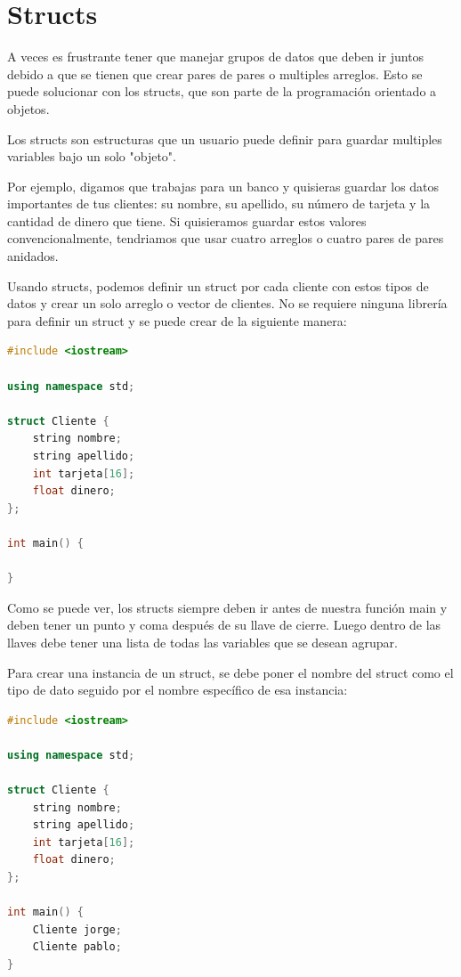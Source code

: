 \documentclass{article}
\begin{document}
\section{Structs}

A veces es frustrante tener que manejar grupos de datos que deben ir juntos debido a que se tienen que crear pares de pares o multiples arreglos. Esto se puede solucionar con los structs, que son parte de la programación orientado a objetos.

Los structs son estructuras que un usuario puede definir para guardar multiples variables bajo un solo "objeto".

Por ejemplo, digamos que trabajas para un banco y quisieras guardar los datos importantes de tus clientes: su nombre, su apellido, su número de tarjeta y la cantidad de dinero que tiene. Si quisieramos guardar estos valores convencionalmente, tendriamos que usar cuatro arreglos o cuatro pares de pares anidados.

Usando structs, podemos definir un struct por cada cliente con estos tipos de datos y crear un solo arreglo o vector de clientes. No se requiere ninguna librería para definir un struct y se puede crear de la siguiente manera:

\begin{lstlisting}[language=C++, title=Definición de un struct]
#include <iostream>

using namespace std;

struct Cliente {
	string nombre;
	string apellido;
	int tarjeta[16];
	float dinero;
};

int main() {

}
\end{lstlisting}

Como se puede ver, los structs siempre deben ir antes de nuestra función main y deben tener un punto y coma después de su llave de cierre. Luego dentro de las llaves debe tener una lista de todas las variables que se desean agrupar.

Para crear una instancia de un struct, se debe poner el nombre del struct como el tipo de dato seguido por el nombre específico de esa instancia:

\begin{lstlisting}[language=C++, title=Instanciamiento]
#include <iostream>

using namespace std;

struct Cliente {
	string nombre;
	string apellido;
	int tarjeta[16];
	float dinero;
};

int main() {
	Cliente jorge;
	Cliente pablo;
}
\end{lstlisting}
\end{document}
